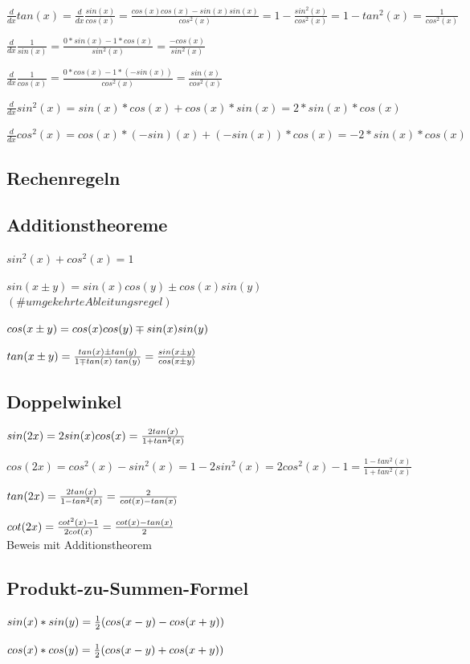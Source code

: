 $\frac{d}{dx}tan(x) = \frac{d}{dx} \frac{sin(x)}{cos(x)} = \frac{cos(x)cos(x)- sin(x)sin(x)}{cos^2(x)} = 1 - \frac{sin^2(x)}{cos^2(x)} = 1 - tan^2(x) = \frac{1}{cos^2(x)}$

$\frac{d}{dx} \frac{1}{sin(x)} = \frac{0*sin(x) - 1*cos(x)}{sin^2(x)} = \frac{-cos(x)}{sin^2(x)}$ 

$\frac{d}{dx} \frac{1}{cos(x)} = \frac{0*cos(x) - 1*(-sin(x))}{cos^2(x)} = \frac{sin(x)}{cos^2(x)}$

$\frac{d}{dx}sin^2(x) = sin(x)*cos(x)+ cos(x)*sin(x) = 2*sin(x)*cos(x)$

$\frac{d}{dx}cos^2(x) = cos(x)*(-sin)(x)+ (-sin(x))*cos(x) = -2*sin(x)*cos(x)$ 
\newpage
\subsection{Rechenregeln}
\subsection{Additionstheoreme}
$sin^2(x)+cos^2(x) = 1$

$sin(x \pm y) = sin(x)cos(y) \pm cos(x)sin(y)$    \ \ $(\# umgekehrteAbleitungsregel)$

$cos(x \pm y) = cos(x)cos(y) \mp sin(x) sin(y)$

$tan(x \pm y) = \frac{tan(x) \pm tan(y)}{ 1 \mp tan(x) \; tan(y) } = \frac{ sin(x \pm y) }{cos(x \pm y) }$

\subsection{Doppelwinkel}
$sin(2x)= 2sin(x) cos(x) = \frac{2 tan(x)}{ 1 + tan^2(x) }$

$cos(2x)= cos^2(x) - sin^2(x) = 1 - 2sin^2(x) = 2cos^2(x) - 1 = \frac{ 1 - tan^2(x) }{ 1 + tan^2(x) }$

$tan(2x)= \frac{ 2 tan(x) }{ 1 - tan^2(x) } = \frac{2}{ cot(x) - tan(x) }$

$cot(2x)= \frac{ cot^2(x) - 1}{2cot(x)} = \frac{cot(x) - tan(x)}{2}$ \\

Beweis mit Additionstheorem



\subsection{Produkt-zu-Summen-Formel}
$sin(x)*sin(y) = \frac{1}{2}(cos(x-y)-cos(x+y))$

$cos(x)*cos(y) = \frac{1}{2}(cos(x-y)+cos(x+y))$

